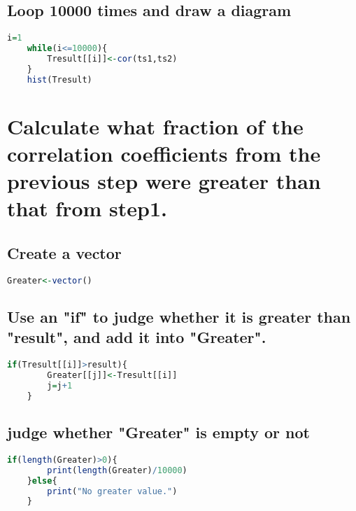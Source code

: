 \documentclass[10pt]{article}
\begin{document}
    \subsection{Loop 10000 times and draw a diagram}
    \begin{lstlisting}[language={R}]
    i=1
    while(i<=10000){
        Tresult[[i]]<-cor(ts1,ts2)
    }
    hist(Tresult)
    \end{lstlisting}

\section{Calculate what fraction of the correlation coefficients from the previous step were greater than that from step1.}
    \subsection{Create a vector}
    \begin{lstlisting}[language={R}]
    Greater<-vector()
    \end{lstlisting}
    \subsection{Use an "if" to judge whether it is greater than "result", and add it into "Greater".}
    \begin{lstlisting}[language={R}]
    if(Tresult[[i]]>result){
        Greater[[j]]<-Tresult[[i]]
        j=j+1
    }
    \end{lstlisting}
    \subsection{judge whether "Greater" is empty or not}
    \begin{lstlisting}[language={R}]
    if(length(Greater)>0){
        print(length(Greater)/10000)
    }else{
        print("No greater value.")
    }
    \end{lstlisting}
\end{document}
